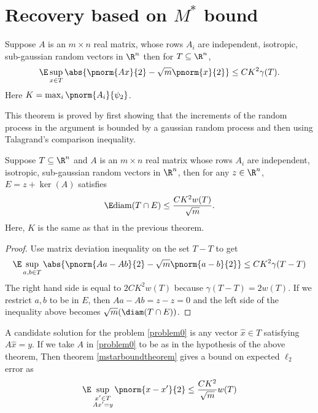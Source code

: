 \section{Recovery based on $M^*$ bound}
\begin{theorem}
	Suppose $A$ is an $m\times n$ real matrix, whose rows 
	$A_i$ are independent, isotropic, sub-gaussian random vectors
	in $\R^n$ then for $T\subseteq \R^n$,
	\begin{equation}\label{matrixdeviation}
		\E \sup_{x\in T} \abs{\pnorm{Ax}{2}-\sqrt{m}\pnorm{x}{2}}
			\leq CK^2\gamma(T).
	\end{equation}
	Here $K = \max_i \pnorm{A_i}{\psi_2}$.
\end{theorem}
This theorem is proved by first showing that the increments of
the random process in the argument is bounded by a gaussian
random process and then using Talagrand's comparison inequality.
\begin{theorem}[$M^*$ bound]\label{mstarboundtheorem}
	Suppose $T\subseteq \R^n$ and $A$ is an $m\times n$ real
	matrix whose rows $A_i$ are independent, isotropic, sub-gaussian
	random vectors in $\R^n$, then for any $z\in\R^n$, $E = z+\ker(A)$ satisfies
	\begin{equation}\label{mstarbound}
		\E \text{diam}(T\cap E)\leq \frac{CK^2w(T)}{\sqrt{m}}.
	\end{equation}
	Here, $K$ is the same as that in the previous theorem.
\end{theorem}
\begin{proof}
	Use matrix deviation inequality on the set $T-T$ to get
	$$\E\sup_{a,b\in T}\abs{\pnorm{Aa-Ab}{2}-\sqrt{m}\pnorm{a-b}{2}}\leq CK^2\gamma(T-T)$$
	The right hand side is equal to $2CK^2 w(T)$ because $\gamma(T-T) = 2w(T)$.
	If we restrict $a, b$ to be in $E$, then $Aa-Ab = z-z= 0$ and the left side of the 
	inequality above becomes $\sqrt{m}(\diam({T\cap E}))$.
\end{proof}

A candidate solution for the problem \eqref{problem0} is any vector $\hat{x}\in T$
satisfying $A\hat{x} = y$.
If we take $A$ in \eqref{problem0} to be as in the hypothesis of the above theorem,
Then theorem \ref{mstarboundtheorem} gives a bound on expected $\ell_2$ error as
\begin{equation}\label{mstarrecovery}
	\E\sup_{\substack{{x'}\in T\\ A{x'}=y}}\pnorm{x-{x'}}{2}
		\leq \frac{CK^2}{\sqrt{m}} w(T)
\end{equation}

